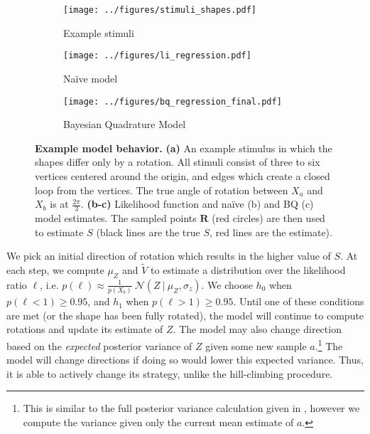 \documentclass{article} %
\newcommand{\naive}[0]{na\"ive}
\newcommand{\Naive}[0]{Na\"ive}
\begin{document}
\begin{figure}[t]
  \centering
  \begin{subfigure}[b]{0.32\textwidth}
    \centering
    \texttt{[image: ../figures/stimuli\_shapes.pdf]}
    \vspace{0pt}
    \caption{Example stimuli}
    \label{fig:stimuli}
  \end{subfigure}
  \begin{subfigure}[b]{0.32\textwidth}
    \centering
    \texttt{[image: ../figures/li\_regression.pdf]}
    \caption{\Naive{} model}
    \label{fig:li}
  \end{subfigure}
  \begin{subfigure}[b]{0.32\textwidth}
    \centering
    \texttt{[image: ../figures/bq\_regression\_final.pdf]}
    \caption{Bayesian Quadrature Model}
    \vspace{0pt}
    \label{fig:bq}
  \end{subfigure}
  \caption{\textbf{Example model behavior.} \textbf{(a)} An example
    stimulus in which the shapes differ only by a rotation. All
    stimuli consist of three to six vertices centered around the
    origin, and edges which create a closed loop from the
    vertices. The true angle of rotation between $X_a$ and $X_b$ is at
    $\frac{2\pi}{3}$. \textbf{(b-c)} Likelihood function and \naive{}
    (b) and BQ (c) model estimates. The sampled points $\mathbf{R}$
    (red circles) are then used to estimate $S$ (black lines are the
    true $S$, red lines are the estimate).}
  \label{fig:shapes}
\end{figure}

We pick an initial direction of rotation which results in the higher
value of $S$. At each step, we compute $\mu_Z$ and $\tilde{V}$ to
estimate a distribution over the likelihood ratio $\ell$, i.e.
$p(\ell)\approx\frac{1}{p(X_b)}\ \mathcal{N}(Z\ \vert\ \mu_Z,
\sigma_z)$.  We choose $h_0$ when $p(\ell < 1)\geq 0.95$, and $h_1$
when $p(\ell > 1)\geq 0.95$. Until one of these conditions are met (or
the shape has been fully rotated), the model will continue to compute
rotations and update its estimate of $Z$.  The model may also change
direction based on the \textit{expected} posterior variance of $Z$
given some new sample $a$.\footnote{This is similar to the full
  posterior variance calculation given in \cite{Osborne:2012tm},
  however we compute the variance given only the current mean estimate
  of $a$.} The model will change directions if doing so would lower
this expected variance. Thus, it is able to actively change its
strategy, unlike the hill-climbing procedure.
\end{document}
